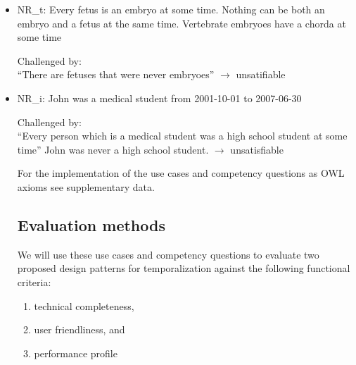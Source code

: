 \begin{itemize}


\item NR\_t: Every fetus is an embryo at some time. Nothing can be both an embryo and a fetus at the same time. Vertebrate embryoes have a chorda at some time

Challenged by: \\ ``There are fetuses that were never embryoes''  $\rightarrow$ unsatifiable




\item NR\_i: John was a medical student from 2001-10-01 to 2007-06-30

Challenged by: \\ ``Every person which is a medical student was a high school student at some time''   
John was never a high school student. $\rightarrow$ unsatisfiable

For the implementation of the use cases and competency questions as OWL axioms see supplementary data.
 
%
%
%
%

\subsection*{Evaluation methods}
We will use these use cases and competency questions to evaluate two proposed design patterns for temporalization against the following functional criteria:
\begin{enumerate}
    \item technical completeness, 
    \item user friendliness, and
    \item performance profile
\end{enumerate}


\end{itemize}
